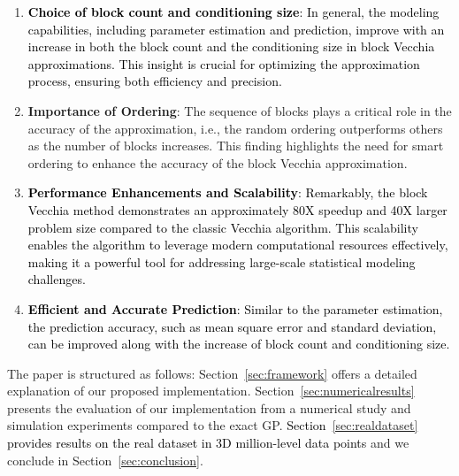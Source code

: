 \documentclass[12pt]{article}
\begin{document}
\begin{enumerate}
    \item \textcolor{black}{\textbf{Choice of block count and conditioning size}: In general, the modeling capabilities, including parameter estimation and prediction, improve with an increase in both the block count and the conditioning size in block Vecchia approximations. This insight is crucial for optimizing the approximation process, ensuring both efficiency and precision.}

    \item \textbf{Importance of Ordering}: The sequence of blocks plays a critical role in the accuracy of the approximation, i.e., the random ordering outperforms others as the number of blocks increases.  This finding highlights the need for smart ordering to enhance the accuracy of the block Vecchia approximation.

    \item \textcolor{black}{\textbf{Performance Enhancements and Scalability}: Remarkably, the block Vecchia method demonstrates an approximately 80X speedup and 40X larger problem size compared to the classic Vecchia algorithm. This scalability enables the algorithm to leverage modern computational resources effectively, making it a powerful tool for addressing large-scale statistical modeling challenges.}
    
     \item \textcolor{black}{\textbf{Efficient and Accurate Prediction}:  Similar to the parameter estimation, the prediction accuracy, such as mean square error and standard deviation, can be improved along with the increase of block count and conditioning size.}
\end{enumerate}

The paper is structured as follows: 
Section~\ref{sec:framework} offers a detailed explanation of our proposed implementation. Section~\ref{sec:numericalresults} presents the evaluation of our implementation from a numerical study and simulation experiments compared to the exact GP. \textcolor{black}{Section~\ref{sec:realdataset} provides results on the real dataset in 3D million-level data points} and we conclude in Section~\ref{sec:conclusion}.
\end{document}
